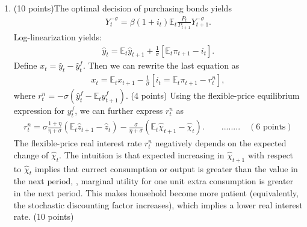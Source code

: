 \documentclass[12pt]{article}
\begin{document}
\begin{enumerate}
    \item (10 points)The optimal decision of purchasing bonds yields
    \begin{align*}
        Y_t^{-\sigma} = \beta (1+i_t) \mathbb{E}_t \frac{P_t}{P_{t+1}} Y_{t+1}^{-\sigma}.
    \end{align*}
    Log-linearization yields:
    \begin{align*}
        \hat{y}_t = \mathbb{E}_t \hat{y}_{t+1} + \frac{1}{\sigma} [\mathbb{E}_t \pi_{t+1} - i_t].
    \end{align*}
    Define $x_t = \hat{y}_t -\hat{y}_t^f$. Then we can rewrite the last equation as
    \begin{align*}
        x_t = \mathbb{E}_t x_{t+1} - \frac{1}{\sigma} [i_t = \mathbb{E}_t \pi_{t+1} - r_t^n],
    \end{align*}
    where $r_t^n = -\sigma(\hat{y}_t^f - \mathbb{E}_t \hat{y}_{t+1}^f)$. (4 points) Using the flexible-price equilibrium expression for $y_t^f$, we can further express $r_t^n$ as
    \begin{align*}
        r_t^n = \sigma \frac{1+\eta}{\eta+\sigma} (\mathbb{E}_t \hat{z}_{t+1} - \hat{z}_t) - \frac{\sigma}{\eta+\sigma} (\mathbb{E}_t \hat{\chi}_{t+1} - \hat{\chi}_t). \qquad ........ \quad(6 \text{ points})
    \end{align*}
    The flexible-price real interest rate $r_t^n$ negatively depends on the expected change of $\hat{\chi}_t$. The intuition is that expected increasing in $\hat{\chi}_{t+1}$ with respect to $\hat{\chi}_t$ implies that currect consumption or output is greater than the value in the next period, , marginal utility for one unit extra consumption is greater in the next period. This makes household become more patient (equivalently, the stochastic discounting factor increases), which implies a lower real interest rate. (10 points)
\end{enumerate}
\end{document}
